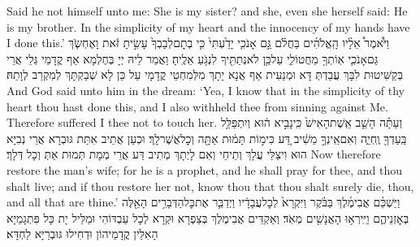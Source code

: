 {Said he not himself unto me: She is my sister? and she, even she herself said: He is my brother. In the simplicity of my heart and the innocency of my hands have I done this.’}{}
{וַיֹּ֩אמֶר֩ אֵלָ֨יו הָֽאֱלֹהִ֜ים בַּחֲלֹ֗ם גַּ֣ם אָנֹכִ֤י יָדַ֙עְתִּי֙ כִּ֤י בְתׇם\maqqaf לְבָבְךָ֙ עָשִׂ֣יתָ זֹּ֔את וָאֶחְשֹׂ֧ךְ גַּם\maqqaf אָנֹכִ֛י אֽוֹתְךָ֖ מֵחֲטוֹ\maqqaf לִ֑י עַל\maqqaf כֵּ֥ן לֹא\maqqaf נְתַתִּ֖יךָ לִנְגֹּ֥עַ אֵלֶֽיהָ׃}
{וַאֲמַר לֵיהּ יְיָ בְּחֶלְמָא אַף קֳדָמַי גְּלֵי אֲרֵי בְּקַשִּׁיטוּת לִבָּךְ עֲבַדְתְּ דָּא וּמְנַעִית אַף אֲנָא יָתָךְ מִלְּמִחְטֵי קֳדָמָי עַל כֵּן לָא שְׁבַקְתָּךְ לְמִקְרַב לְוָתַהּ׃}
{And God said unto him in the dream: ‘Yea, I know that in the simplicity of thy heart thou hast done this, and I also withheld thee from sinning against Me. Therefore suffered I thee not to touch her.}{}
{וְעַתָּ֗ה הָשֵׁ֤ב אֵֽשֶׁת\maqqaf הָאִישׁ֙ כִּֽי\maqqaf נָבִ֣יא ה֔וּא וְיִתְפַּלֵּ֥ל בַּֽעַדְךָ֖ וֶֽחְיֵ֑ה וְאִם\maqqaf אֵֽינְךָ֣ מֵשִׁ֔יב דַּ֚ע כִּי\maqqaf מ֣וֹת תָּמ֔וּת אַתָּ֖ה וְכׇל\maqqaf אֲשֶׁר\maqqaf לָֽךְ׃}
{וּכְעַן אֲתֵיב אִתַּת גּוּבְרָא אֲרֵי נְבִיָּא הוּא וִיצַלֵּי עֲלָךְ וְתֵיחֵי וְאִם לָיְתָךְ מְתִיב דַּע אֲרֵי מְמָת תְּמוּת אַתְּ וְכָל דְּלָךְ׃}
{Now therefore restore the man’s wife; for he is a prophet, and he shall pray for thee, and thou shalt live; and if thou restore her not, know thou that thou shalt surely die, thou, and all that are thine.’}{}
{וַיַּשְׁכֵּ֨ם אֲבִימֶ֜לֶךְ בַּבֹּ֗קֶר וַיִּקְרָא֙ לְכׇל\maqqaf עֲבָדָ֔יו וַיְדַבֵּ֛ר אֶת\maqqaf כׇּל\maqqaf הַדְּבָרִ֥ים הָאֵ֖לֶּה בְּאׇזְנֵיהֶ֑ם וַיִּֽירְא֥וּ הָאֲנָשִׁ֖ים מְאֹֽד׃}
{וְאַקְדֵּים אֲבִימֶלֶךְ בְּצַפְרָא וּקְרָא לְכָל עַבְדּוֹהִי וּמַלֵּיל יָת כָּל פִּתְגָמַיָּא הָאִלֵּין קֳדָמֵיהוֹן וּדְחִילוּ גּוּבְרַיָּא לַחְדָּא׃}
